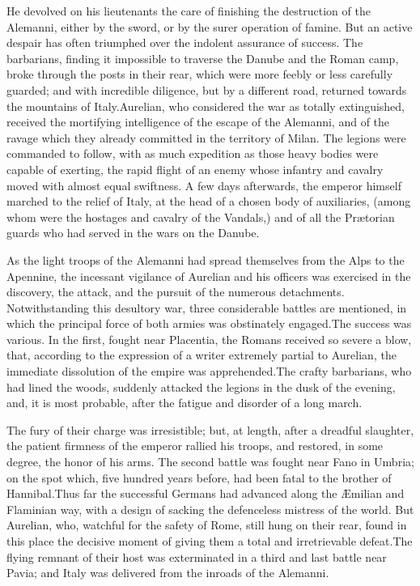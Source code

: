 He devolved on his lieutenants the care of finishing the
destruction of the Alemanni, either by the sword, or by the surer
operation of famine. But an active despair has often triumphed
over the indolent assurance of success. The barbarians, finding
it impossible to traverse the Danube and the Roman camp, broke
through the posts in their rear, which were more feebly or less
carefully guarded; and with incredible diligence, but by a
different road, returned towards the mountains of Italy.\footnotemark[32]
Aurelian, who considered the war as totally extinguished,
received the mortifying intelligence of the escape of the
Alemanni, and of the ravage which they already committed in the
territory of Milan. The legions were commanded to follow, with as
much expedition as those heavy bodies were capable of exerting,
the rapid flight of an enemy whose infantry and cavalry moved
with almost equal swiftness. A few days afterwards, the emperor
himself marched to the relief of Italy, at the head of a chosen
body of auxiliaries, (among whom were the hostages and cavalry of
the Vandals,) and of all the Prætorian guards who had served in
the wars on the Danube.\footnotemark[33]



As the light troops of the Alemanni had spread themselves from
the Alps to the Apennine, the incessant vigilance of Aurelian and
his officers was exercised in the discovery, the attack, and the
pursuit of the numerous detachments. Notwithstanding this
desultory war, three considerable battles are mentioned, in which
the principal force of both armies was obstinately engaged.\footnotemark[34]
The success was various. In the first, fought near Placentia, the
Romans received so severe a blow, that, according to the
expression of a writer extremely partial to Aurelian, the
immediate dissolution of the empire was apprehended.\footnotemark[35] The
crafty barbarians, who had lined the woods, suddenly attacked the
legions in the dusk of the evening, and, it is most probable,
after the fatigue and disorder of a long march.

The fury of their charge was irresistible; but, at length, after
a dreadful slaughter, the patient firmness of the emperor rallied
his troops, and restored, in some degree, the honor of his arms.
The second battle was fought near Fano in Umbria; on the spot
which, five hundred years before, had been fatal to the brother
of Hannibal.\footnotemark[36] Thus far the successful Germans had advanced
along the Æmilian and Flaminian way, with a design of sacking the
defenceless mistress of the world. But Aurelian, who, watchful
for the safety of Rome, still hung on their rear, found in this
place the decisive moment of giving them a total and
irretrievable defeat.\footnotemark[37] The flying remnant of their host was
exterminated in a third and last battle near Pavia; and Italy was
delivered from the inroads of the Alemanni.

